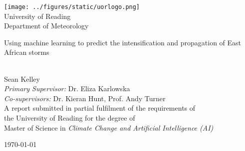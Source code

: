 \documentclass[a4paper,11pt,oneside]{book}
\begin{document}
    
    \frontmatter
    
    \begin{titlepage}      
        \begin{center}
            \texttt{[image: ../figures/static/uorlogo.png]}\\[0.5cm]
            {\LARGE University of Reading\\[0.5cm]
            Department of Meteorology}\\[2cm]
			
            \linespread{1.2}\huge {
                Using machine learning to predict the intensification and propagation of East African storms
            
            }
            \linespread{1}~\\[2cm]
            {\Large
                Sean Kelley
            }\\[1cm] 
            
            {\large           
                \emph{Primary Supervisor:} Dr. Eliza Karlowska\\
                \emph{Co-supervisors:} Dr. Kieran Hunt, Prof. Andy Turner 
            }\\[1cm]
            
            \large A report submitted in partial fulfilment of the requirements of\\the University of Reading for the degree of\\
            Master of Science in \textit{Climate Change and Artificial Intelligence (AI)}\\[0.3cm] 
            \vfill
            
            \today %
        \end{center}
    \end{titlepage}
    
    
    
    

    

    \tableofcontents
    \listoffigures
    \listoftables

    
    \printnomenclature
    \newpage

    
    \printglossary
    \printglossary[type=\acronymtype]
    \newpage

    \mainmatter
    
    
    
    
    
    

    
    
    \begin{appendices}
        
    \end{appendices}
    
\end{document}
